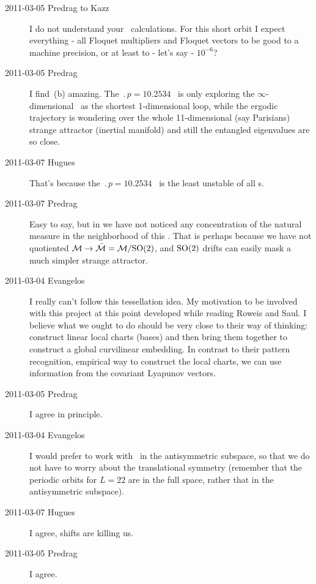 \begin{description}
\item[2011-03-05 Predrag to Kazz] I do not understand your \po\ calculations.
For this short orbit I expect everything - all Floquet multipliers and 
Floquet vectors to be good to a machine precision, or at least to - let's say -
$10^{-6}$?

\item[2011-03-05 Predrag]
I find 
\,(b) amazing. The $\period{p}=10.2534$ \po\ is
only exploring the $\infty$-dimensional \statesp\ as the 
shortest 1-dimensional loop, while the ergodic trajectory is
wondering over the whole 11-dimensional (say Parisians) strange attractor
(inertial manifold) and still the entangled eigenvalues are so close.

\item[2011-03-07 Hugues]
That's because the $\period{p}=10.2534$ \po\ is the least unstable of all
\po s.

\item[2011-03-07 Predrag] Easy to say, but in  we have
not noticed any concentration of the natural measure in the neighborhood of
this \po. That is perhaps because we have not quotiented 
${\cal M} \to \bar{\cal M} = {\cal M}/\textrm{SO}(2)$, and $\textrm{SO}(2)$ drifts can easily
mask a much simpler strange attractor.


\item[2011-03-04 Evangelos]
I really can't follow this tessellation idea. My motivation to be
involved with this project at this point developed while reading Roweis
and Saul. I believe what we ought to do should be very close
to their way of thinking: construct linear local charts (bases) and then
bring them together to construct a global curvilinear embedding. In
contrast to their pattern recognition, empirical way to construct the
local charts, we can use information from the covariant Lyapunov vectors.

\item[2011-03-05 Predrag]
I agree in principle.

\item[2011-03-04 Evangelos]
I would prefer to work with \KS\ in the antisymmetric subspace, so that we do not
have to worry about the translational symmetry (remember that the periodic
orbits for $L=22$ are in the full space, rather that in the antisymmetric
subspace).

\item[2011-03-07 Hugues]
I agree, shifts are killing us.

\item[2011-03-05 Predrag]
I agree.



\end{description}
